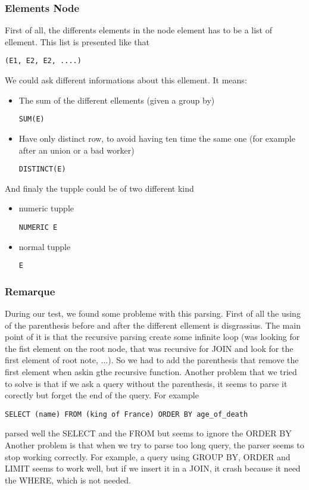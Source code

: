 \documentclass{article}
\begin{document}
\subsubsection{Elements Node}
First of all, the differents elements in the node element has to be a list of ellement. This list is presented like that
\begin{verbatim}
(E1, E2, E2, ....)
\end{verbatim}
We could ask different informations about this ellement. It means:
\begin{itemize}
\item The sum of the different ellements (given a group by)
\begin{verbatim}
SUM(E)
\end{verbatim}
\item Have only distinct row, to avoid having ten time the same one (for example after an union or a bad worker)
\begin{verbatim}
DISTINCT(E)
\end{verbatim}
\end{itemize}
And finaly the tupple could be of two different kind
\begin{itemize}
\item numeric tupple
\begin{verbatim}
NUMERIC E
\end{verbatim}
\item normal tupple
\begin{verbatim}
E
\end{verbatim}
\end{itemize}
\subsubsection{Remarque}
During our test, we found some probleme with this parsing. First of all the using of the parenthesis before and after the different ellement is disgrassius. The main point of it is that the recursive parsing create some infinite loop (was looking for the fist element on the root node, that was recursive for JOIN and look for the first element of root note, ...). So we had to add the parenthesis that remove the first element when askin gthe recursive function.
Another problem that we tried to solve is that if we ask a query without the parenthesis, it seems to parse it corectly but forget the end of the query. For example
\begin{verbatim}
SELECT (name) FROM (king of France) ORDER BY age_of_death
\end{verbatim}
parsed well the SELECT and the FROM but seems to ignore the ORDER BY
Another problem is that when we try to parse too long query, the parser seems to stop working correctly. For example, a query using GROUP BY, ORDER and LIMIT seems to work well, but if we insert it in a JOIN, it crash because it need the WHERE, which is not needed.
\end{document}
